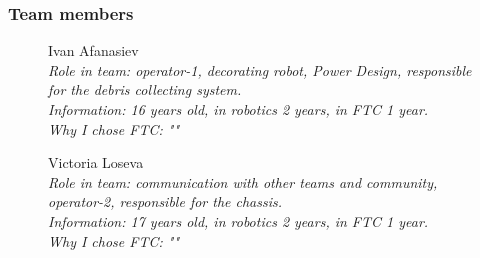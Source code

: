 \subsubsection{Team members}
\begin{figure}[H]
	\begin{minipage}[h]{0.47\linewidth}
	\end{minipage}
	\hfill
	\begin{minipage}[h]{0.47\linewidth}
		Ivan Afanasiev \\
		\emph{Role in team: operator-1, decorating robot, Power Design, responsible for the debris collecting system.\\}
		\emph{Information: 16 years old, in robotics 2 years, in FTC 1 year. \\}
		\emph{Why I chose FTC: ""}		
	\end{minipage}
	\vfill 
	\begin{minipage}[h]{0.47\linewidth}
		Victoria Loseva\\
		\emph{Role in team: communication with other teams and community, operator-2, responsible for the chassis. \\  }
		\emph{Information: 17 years old, in robotics 2 years, in FTC 1 year. \\}
		\emph{Why I chose FTC: ""}					
	\end{minipage}
	\hfill
	\begin{minipage}[h]{0.47\linewidth}
		\\

\end{minipage}
\end{figure}
